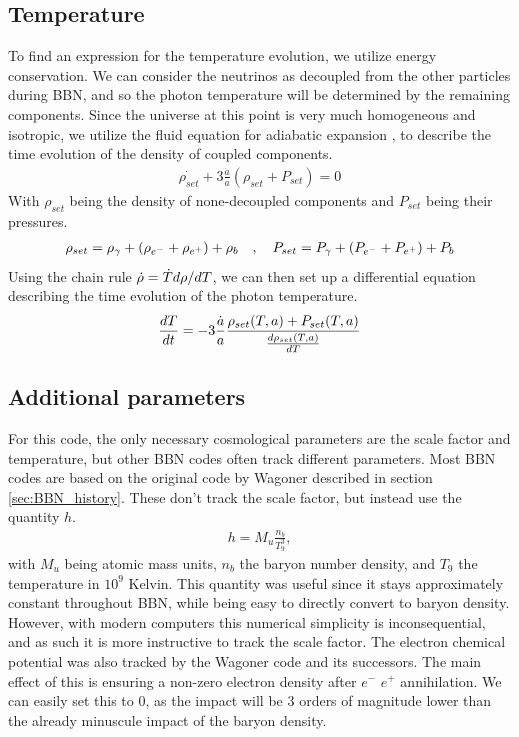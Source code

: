 \subsection{Temperature}
To find an expression for the temperature evolution, we utilize energy conservation. We can consider the neutrinos as decoupled from the other particles during BBN, and so the photon temperature will be determined by the remaining components. Since the universe at this point is very much homogeneous and isotropic, we utilize the fluid equation for adiabatic expansion \cite[{(4.44)}]{Ryden}, to describe the time evolution of the density of coupled components.
\begin{align}
    \dot{\rho_{set}}+3\frac{\dot{a}}{a}(\rho_{set} + P_{set})=0
\end{align}
With $\rho_{set}$ being the density of none-decoupled components and $P_{set}$ being their pressures.
\begin{align}
    \rho_{set}=\rho_{\gamma}+(\rho_{e^-}+\rho_{e^+})+\rho_{b}
    \quad , \quad P_{set}=P_{\gamma}+(P_{e^-}+P_{e^+})+P_{b}
\end{align}
Using the chain rule $\dot{\rho}=\dot{T}d\rho/dT$, we can then set up a differential equation describing the time evolution of the photon temperature. 
\begin{align}
    \frac{dT}{dt}=-3\frac{\dot{a}}{a}\frac{\rho_{set}(T,a) + P_{set}(T,a)}{\frac{d\rho_{set}(T,a)}{dT}}
    \label{eq:dTdt}
\end{align}

\subsection{Additional parameters}
For this code, the only necessary cosmological parameters are the scale factor and temperature, but other BBN codes often track different parameters. Most BBN codes are based on the original code by Wagoner described in section \ref{sec:BBN_history}. These don't track the scale factor, but instead use the quantity $h$.
\begin{align}
    h=M_u\frac{n_{b}}{T^3_9},
\end{align}
with $M_u$ being atomic mass units, $n_b$ the baryon number density, and  $T_9$ the temperature in $10^9$ Kelvin. This quantity was useful since it stays approximately constant throughout BBN, while being easy to directly convert to baryon density. However, with modern computers this numerical simplicity is inconsequential, and as such it is more instructive to track the scale factor.
The electron chemical potential was also tracked by the Wagoner code and its successors. The main effect of this is ensuring a non-zero electron density after $e^-$ $e^+$ annihilation. We can easily set this to 0, as the impact will be 3 orders of magnitude lower than the already minuscule impact of the baryon density.

